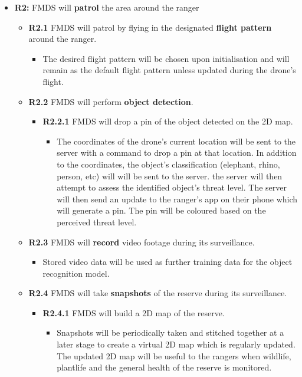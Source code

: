\begin{flushleft}
		\begin{itemize}
			\item{\textbf{R2:}} FMDS will \textbf{patrol} the area around the ranger
				\begin{itemize}
					\item{\textbf{R2.1}} FMDS will patrol by flying in the designated \textbf{flight pattern} around the ranger.
						\begin{itemize}
							\item The desired flight pattern will be chosen upon initialisation and will remain as the default flight pattern unless updated during the drone's flight.
						\end{itemize}
					\item{\textbf{R2.2}} FMDS will perform \textbf{object detection}.
						\begin{itemize}
							\item{\textbf{R2.2.1}} FMDS will drop a pin of the object detected on the 2D map.
								\begin{itemize}
									\item The coordinates of the drone's current location will be sent to the server with a command to drop a pin at that location. In addition to the coordinates, the object's classification (elephant, rhino, person, etc) will will be sent to the server. the server will then attempt to assess the identified object's threat level. The server will then send an update to the ranger's app on their phone which will generate a pin. The pin will be coloured based on the perceived threat level. 
								\end{itemize} 
						\end{itemize}
					\item{\textbf{R2.3}} FMDS will \textbf{record} video footage during its surveillance.
						\begin{itemize}
							\item Stored video data will be used as further training data for the object recognition model.
						\end{itemize} 
					\item{\textbf{R2.4}} FMDS will take \textbf{snapshots} of the reserve during its surveillance.
						\begin{itemize}
							\item{\textbf{R2.4.1}} FMDS will build a 2D map of the reserve.
								\begin{itemize}
									\item Snapshots will be periodically taken and stitched together at a later stage to create a virtual 2D map which is regularly updated. The updated 2D map will be useful to the rangers when wildlife, plantlife and the general health of the reserve is monitored.
								\end{itemize} 
						\end{itemize}
				\end{itemize}
		\end{itemize}
	\end{flushleft}

